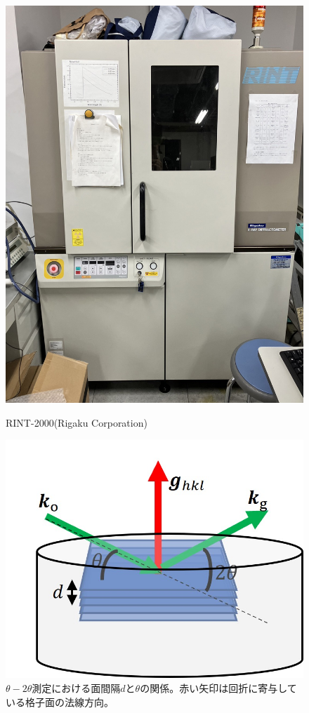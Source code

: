 \documentclass[dvipdfmx,12pt,a4paper]{jreport}
\begin{document}
			\begin{figure}[h]
				\centering
				\begin{minipage}{0.45\hsize}
					\centering
					\includegraphics[width=0.9\linewidth]{rint_2000.jpg}
					\caption{RINT-2000(Rigaku Corporation)}
					\label{XRD_nakajima}
				\end{minipage}
				\begin{minipage}{0.45\hsize}
					\centering
					\includegraphics[scale=0.9]{theta_2theta.jpg}
					\caption{$\theta-2\theta$測定における面間隔$d$と$\theta$の関係。赤い矢印は回折に寄与している格子面の法線方向。}
					\label{XRD_theta_2theta}
				\end{minipage}
			\end{figure}
\end{document}
